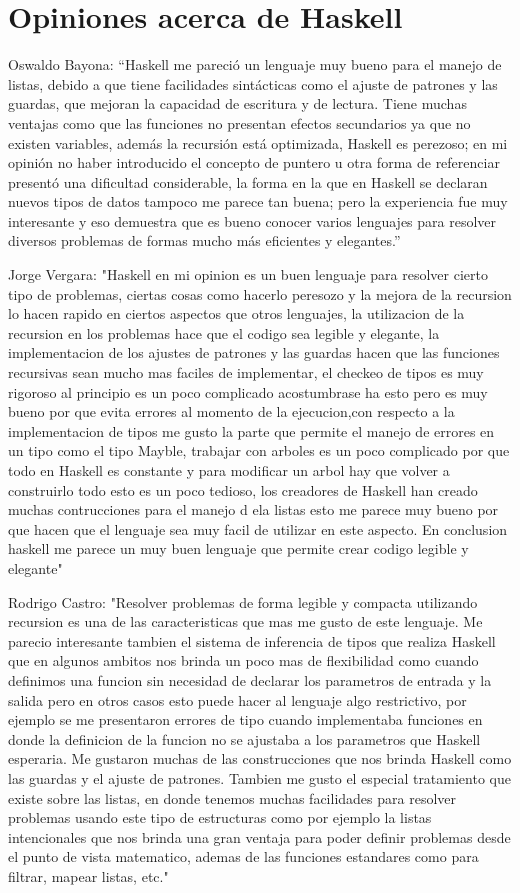 \documentclass[11pt]{article} %
\begin{document}
\section{Opiniones acerca de Haskell}

Oswaldo Bayona: “Haskell me pareció un lenguaje muy bueno para el manejo de listas, debido a que tiene facilidades sintácticas como el ajuste de patrones y las guardas, que mejoran la capacidad de escritura y de lectura. Tiene muchas ventajas como que las funciones no presentan efectos secundarios ya que  no existen variables, además la recursión está optimizada, Haskell es perezoso;  en mi opinión no haber introducido el concepto de puntero u otra forma de referenciar presentó una dificultad considerable,  la forma en la que en Haskell se declaran nuevos  tipos de datos tampoco me parece tan buena;  pero la experiencia fue muy interesante y eso demuestra que  es bueno conocer varios lenguajes para resolver diversos problemas de formas mucho más eficientes y elegantes.”

Jorge Vergara: "Haskell en mi opinion es un buen lenguaje para resolver cierto tipo de problemas, ciertas cosas como hacerlo peresozo y la mejora de la recursion lo hacen rapido en ciertos aspectos que otros lenguajes, la utilizacion de la recursion en los problemas hace que el codigo sea legible y elegante, la implementacion de los ajustes de patrones y las guardas hacen que las funciones recursivas sean mucho mas faciles de implementar, el checkeo de tipos es muy rigoroso al principio es un poco complicado acostumbrase ha esto pero es muy bueno por que evita errores al momento de la ejecucion,con respecto a la implementacion de tipos me gusto la parte que permite el manejo de errores en un tipo como el tipo Mayble, trabajar con arboles es un poco complicado por que todo en Haskell es constante y para modificar un arbol hay que volver a construirlo todo esto es un poco tedioso, los creadores de Haskell han creado muchas contrucciones para el manejo d ela listas esto me parece muy bueno por que hacen que el lenguaje sea muy facil de utilizar en este aspecto. En conclusion haskell me parece un muy buen lenguaje que permite crear codigo legible y elegante"


Rodrigo Castro: "Resolver problemas de forma legible y compacta utilizando recursion es una de las caracteristicas que mas me gusto de este lenguaje. Me parecio interesante tambien el sistema de inferencia de tipos que realiza Haskell que en algunos ambitos nos brinda un poco mas de flexibilidad como cuando definimos una funcion sin necesidad de declarar los parametros de entrada y la salida pero en otros casos esto puede hacer al lenguaje algo restrictivo, por ejemplo se me presentaron errores de tipo cuando implementaba funciones en donde la definicion de la funcion no se ajustaba a los parametros que Haskell esperaria. Me gustaron muchas de las construcciones que nos brinda Haskell como las guardas y el ajuste de patrones. Tambien me gusto el especial tratamiento que existe sobre las listas, en donde tenemos muchas facilidades para resolver problemas usando este tipo de estructuras como por ejemplo la listas intencionales que nos brinda una gran ventaja para poder definir problemas desde el punto de vista matematico,  ademas de las funciones estandares como para filtrar, mapear listas, etc."
\end{document}
